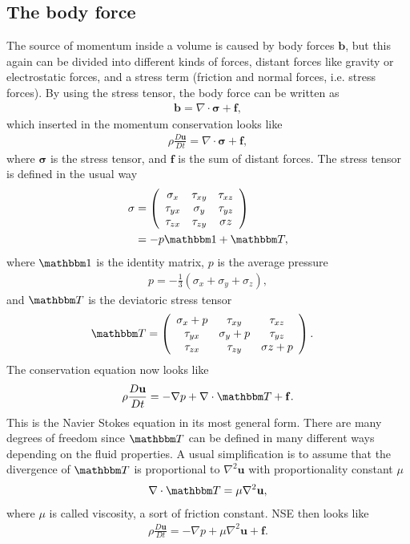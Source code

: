 \documentclass[a4paper,10pt]{article}
\renewcommand{\vec}[1]{\mathbf{#1}}
\renewcommand{\(}{\left(}
\renewcommand{\)}{\right)}
\begin{document}
\subsection{The body force}
The source of momentum inside a volume is caused by body forces $\vec b$, but this again can be divided into different kinds of forces, distant forces like gravity or electrostatic forces, and a stress term (friction and normal forces, i.e. stress forces). By using the stress tensor, the body force can be written as
\begin{align*}
  \vec b = \nabla \cdot \vec \sigma + \vec f,
\end{align*}
which inserted in the momentum conservation looks like
\begin{align*}
  \rho \frac{D\vec u}{D t} = \nabla \cdot \vec \sigma + \vec f,
\end{align*}
where $\vec \sigma$ is the stress tensor, and $\vec f$ is the sum of distant forces. The stress tensor is defined in the usual way
\begin{align*}
  \vec \sigma &= 
  \left (
  \begin{array}{c c c}
  \sigma_x & \tau_{xy} & \tau_{xz}\\
  \tau_{yx} & \sigma_{y} & \tau_{yz}\\
  \tau_{zx} & \tau_{zy} & \sigma{z}
  \end{array}
  \right )\\
  &= -p\mathbbm 1 + \mathbbm T,
\end{align*}
where $\mathbbm 1$ is the identity matrix, $p$ is the average pressure
\begin{align*}
  p = -\frac{1}{3}(\sigma_x + \sigma_y + \sigma_z),
\end{align*}
and $\mathbbm T$ is the deviatoric stress tensor
\begin{align*}
  \mathbbm T &= 
  \left (
  \begin{array}{c c c}
  \sigma_x + p & \tau_{xy} & \tau_{xz}\\
  \tau_{yx} & \sigma_{y} + p & \tau_{yz}\\
  \tau_{zx} & \tau_{zy} & \sigma{z} + p
  \end{array}
  \right ).
\end{align*}
The conservation equation now looks like
\begin{align*}
  \rho \frac{D\vec u}{D t} = -\nabla p + \nabla\cdot \mathbbm T + \vec f.
\end{align*}
This is the Navier Stokes equation in its most general form. There are many degrees of freedom since $\mathbbm T$ can be defined in many different ways depending on the fluid properties. A usual simplification is to assume that the divergence of $\mathbbm T$ is proportional to $\nabla^2 \vec u$ with proportionality constant $\mu$
\begin{align*}
  \nabla \cdot \mathbbm T = \mu \nabla^2 \vec u,
\end{align*}
where $\mu$ is called viscosity, a sort of friction constant. NSE then looks like
\begin{align}
  \rho \frac{D\vec u}{D t} = -\nabla p + \mu\nabla^2 \vec u + \vec f.
\end{align}
\end{document}
